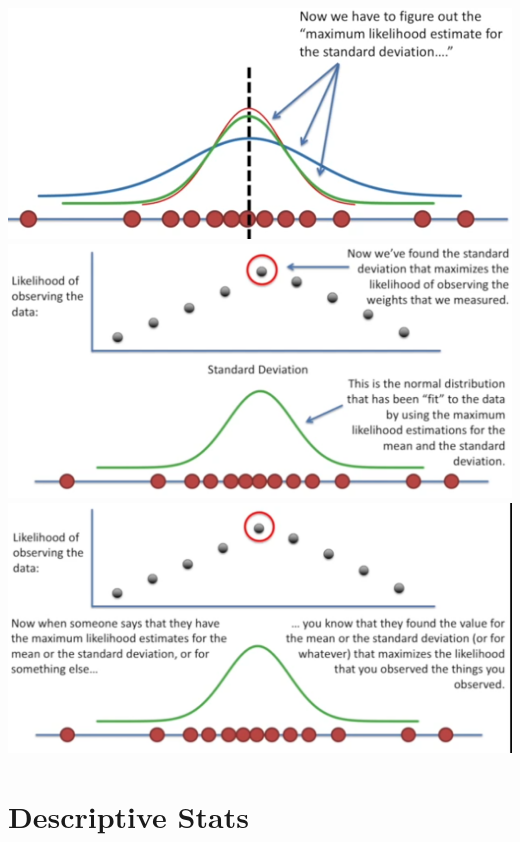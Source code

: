 \documentclass{beamer}
\begin{document}
\begin{frame}
	\includegraphics[scale=0.15]{figs/likelihoodsd}	\includegraphics[scale=0.15]{figs/likelihoodsd2}	\includegraphics[scale=0.15]{figs/likelihoodsd3}\\
\end{frame}

\section{Descriptive Stats}
\end{document}
